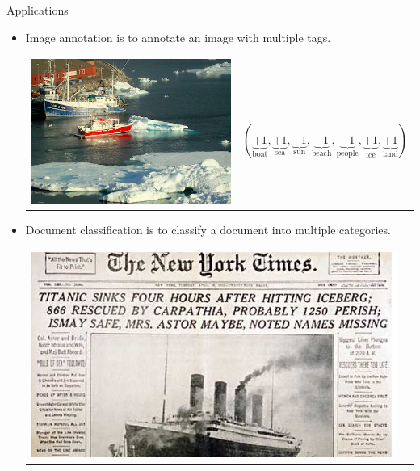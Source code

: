 \documentclass[first=dgreen,second=purple,logo=yellowexc]{aaltoslides}
\begin{document}
{\begin{frame}{Applications}
	\begin{itemize}
		\item Image annotation is to annotate an image with multiple tags.
		\begin{tabular}{p{3cm}p{10cm}}
        \multirow{2}{*}{\includegraphics[scale = 0.13]{./figures/boatsea.png}} & \\
		& $(\underbrace{+1}_{\text{boat}},\underbrace{+1}_{\text{sea}},\underbrace{-1}_{\text{sun}},\underbrace{-1}_{\text{beach}},\underbrace{-1}_{\text{people}},\underbrace{+1}_{\text{ice}},\underbrace{+1}_{\text{land}})$\\
        \end{tabular}
		\item Document classification is to classify a document into multiple categories.\\
		\begin{tabular}{p{3cm}p{10cm}} 
        \multirow{2}{*}{\includegraphics[scale = 0.13]{./figures/titanic.jpg}} & \\

\end{tabular}
\end{itemize}
\end{frame}}
\end{document}
